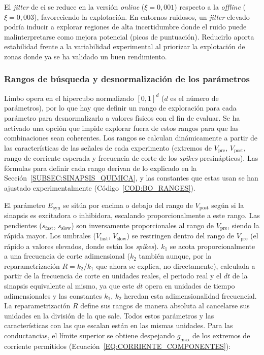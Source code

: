 El \textit{jitter} de \ac{ei} se reduce en la versión \textit{online} ($\xi = 0{,}001$) respecto a la \textit{offline} ($\xi = 0{,}003$), favoreciendo la explotación. En entornos ruidosos, un \textit{jitter} elevado podría inducir a explorar regiones de alta incertidumbre donde el ruido puede malinterpretarse como mejora potencial (picos de puntuación). Reducirlo aporta estabilidad frente a la variabilidad experimental al priorizar la explotación de zonas donde ya se ha validado un buen rendimiento.

\subsubsection{Rangos de búsqueda y desnormalización de los parámetros}

Limbo opera en el hipercubo normalizado $[0, 1]^{d}$ ($d$ es el número de parámetros), por lo que hay que definir un rango de exploración para cada parámetro para desnormalizarlo a valores físicos con el fin de evaluar. Se ha activado una opción que impide explorar fuera de estos rangos para que las combinaciones sean coherentes. Los rangos se calculan dinámicamente a partir de las características de las señales de cada experimento (extremos de $V_{\mathrm{pre}}$, $V_{\mathrm{post}}$, rango de corriente esperada y frecuencia de corte de los \textit{spikes} presinápticos). Las fórmulas para definir cada rango derivan de lo explicado en la Sección~\ref{SUBSEC:SINAPSIS_QUIMICA}, y las constantes que estas usan se han ajustado experimentalmente (Código~\ref{COD:BO_RANGES}).

El parámetro $E_{\mathrm{syn}}$ se sitúa por encima o debajo del rango de $V_{\mathrm{post}}$ según si la sinapsis es excitadora o inhibidora, escalando proporcionalmente a este rango. Las pendientes ($s_{\mathrm{fast}}$, $s_{\mathrm{slow}}$) son inversamente proporcionales al rango de $V_{\mathrm{pre}}$, siendo la rápida mayor. Los umbrales ($V_{\mathrm{fast}}$, $V_{\mathrm{slow}}$) se restringen dentro del rango de $V_{\mathrm{pre}}$ (el rápido a valores elevados, donde están los \textit{spikes}). $k_1$ se acota proporcionalmente a una frecuencia de corte adimensional ($k_2$ también aunque, por la reparametrización $R=k_2/k_1$ que ahora se explica, no directamente), calculada a partir de la frecuencia de corte en unidades reales, el periodo real y el $dt$ de la sinapsis equivalente al mismo, ya que este $dt$ opera en unidades de tiempo adimensionales y las constantes $k_1$, $k_2$ heredan esta adimensionalidad frecuencial. La reparametrización $R$ define sus rangos de manera absoluta al cancelarse sus unidades en la división de la que sale. Todos estos parámetros y las características con las que escalan están en las mismas unidades. Para las conductancias, el límite superior se obtiene despejando $g_{\max}$ de los extremos de corriente permitidos (Ecuación~\ref{EQ:CORRIENTE_COMPONENTES}):

